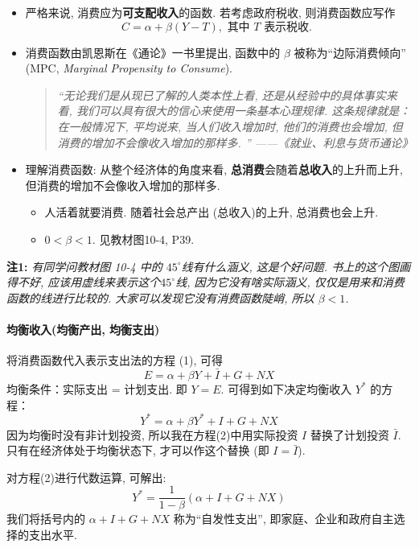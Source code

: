 \documentclass[11pt]{ctexart}
\begin{document}
\begin{itemize}
\item 严格来说, 消费应为\textbf{可支配收入}的函数. 若考虑政府税收, 则消费函数应写作
$$
C = \alpha + \beta  (Y-T),  \text{ 其中 $T$ 表示税收. }
$$
\item 
  消费函数由凯恩斯在《通论》一书里提出, 函数中的 $\beta$ 被称为``边际消费倾向'' (MPC, \textit{Marginal Propensity to Consume}).
  \begin{quote}
    {\it ``无论我们是从现已了解的人类本性上看, 还是从经验中的具体事实来看, 我们可以具有很大的信心来使用一条基本心理规律. 这条规律就是：在一般情况下, 平均说来, 当人们收入增加时, 他们的消费也会增加, 但消费的增加不会像收入增加的那样多. '' ——《就业、利息与货币通论》}
  \end{quote}
  
\item
  理解消费函数: 从整个经济体的角度来看, \textbf{总消费}会随着\textbf{总收入}的上升而上升, 但消费的增加不会像收入增加的那样多.
  \begin{itemize}
  \item
    人活着就要消费. 随着社会总产出 (总收入)的上升, 总消费也会上升. 
  \item
    $ 0 < \beta < 1$. 见教材图10-4, P39.
  \end{itemize}
\end{itemize}

\begin{framed}
\textbf{注1:} \textit{有同学问教材图 10-4 中的 $45^\circ$线有什么涵义, 这是个好问题. 书上的这个图画得不好, 应该用虚线来表示这个$45^\circ$线, 因为它没有啥实际涵义, 仅仅是用来和消费函数的线进行比较的. 
大家可以发现它没有消费函数陡峭, 所以 $\beta < 1$.}  
\end{framed}


\paragraph{均衡收入(均衡产出, 均衡支出)}
将消费函数代入表示支出法的方程  (1),  可得
\[ E = \alpha + \beta Y + \bar{I} + G + NX\]
均衡条件：实际支出 = 计划支出. 即 $Y=E$. 可得到如下决定均衡收入 $Y^*$
的方程：
\[Y^* = \alpha + \beta Y^* + {I} + G + NX \tag{2}\]
因为均衡时没有非计划投资, 所以我在方程(2)中用实际投资 $I$ 替换了计划投资 $\bar{I}$. 只有在经济体处于均衡状态下, 才可以作这个替换 (即 $I = \bar{I}$).

对方程(2)进行代数运算, 可解出:
\[Y^* = \frac{1}{1-\beta}  (\alpha + {I} + G + NX) \tag{3}\]
我们将括号内的 $\alpha + I + G + NX$
称为``自发性支出'', 即家庭、企业和政府自主选择的支出水平. 
\end{document}
